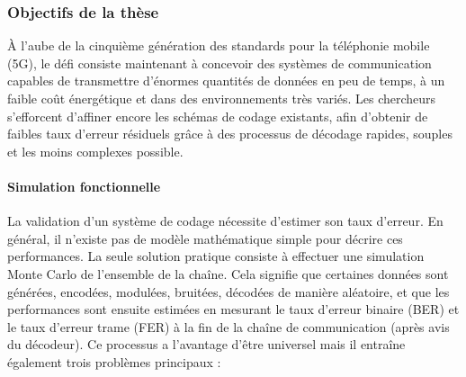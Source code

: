 \subsubsection*{Objectifs de la thèse}

À l'aube de la cinquième génération des standards pour la téléphonie mobile
(5G), le défi consiste maintenant à concevoir des systèmes de communication
capables de transmettre d'énormes quantités de données en peu de temps, à un
faible coût énergétique et dans des environnements très variés. Les chercheurs
s'efforcent d'affiner encore les schémas de codage existants, afin d'obtenir de
faibles taux d'erreur résiduels grâce à des processus de décodage rapides,
souples et les moins complexes possible.

\paragraph{Simulation fonctionnelle}

La validation d'un système de codage nécessite d'estimer son taux d'erreur. En
général, il n'existe pas de modèle mathématique simple pour décrire ces
performances. La seule solution pratique consiste à effectuer une simulation
Monte Carlo de l'ensemble de la chaîne. Cela signifie que certaines données sont
générées, encodées, modulées, bruitées, décodées de manière aléatoire, et que
les performances sont ensuite estimées en mesurant le taux d'erreur binaire
(BER) et le taux d'erreur trame (FER) à la fin de la chaîne de communication
(après avis du décodeur). Ce processus a l'avantage d'être universel mais il
entraîne également trois problèmes principaux :

